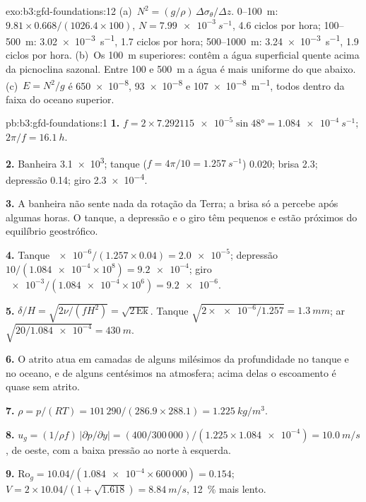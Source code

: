 \begin{solution}{exo:b3:gfd-foundations:12}
(a)~$N^2 = (g/\rho)\,\Delta\sigma_\theta/\Delta z$. 0--\qty{100}{m}:
$9.81\times0.668/(1026.4\times100)$, $N = \qty{7.99e-3}{s^{-1}}$, 4.6
ciclos por hora; 100--\qty{500}{m}: \qty{3.02e-3}{s^{-1}}, 1.7 ciclos por
hora; 500--\qty{1000}{m}: \qty{3.24e-3}{s^{-1}}, 1.9 ciclos por hora.
(b)~Os \qty{100}{m} superiores: contêm a água superficial quente acima da
picnoclina sazonal. Entre 100 e \qty{500}{m} a água é mais
uniforme do que abaixo. (c)~$E = N^2/g$ é \num{650e-8}, \num{93e-8} e
\qty{107e-8}{m^{-1}}, todos dentro da faixa do oceano superior.
\end{solution}

\begin{solution}{pb:b3:gfd-foundations:1}
\textbf{1.} $f = 2\times\num{7.292115e-5}\sin\ang{48} =
\qty{1.084e-4}{s^{-1}}$; $2\pi/f = \qty{16.1}{h}$.

\textbf{2.} Banheira \num{3.1e3}; tanque ($f = 4\pi/10 = \qty{1.257}{s^{-1}}$)
0.020; brisa 2.3; depressão 0.14; giro \num{2.3e-4}.

\textbf{3.} A banheira não sente nada da rotação da Terra; a brisa
só a percebe após algumas horas. O tanque, a depressão e o giro têm
 pequenos e estão próximos do equilíbrio geostrófico.

\textbf{4.} Tanque $\num{e-6}/(1.257\times0.04) = \num{2.0e-5}$; depressão
$10/(\num{1.084e-4}\times10^8) = \num{9.2e-4}$; giro
$\num{e-3}/(\num{1.084e-4}\times10^6) = \num{9.2e-6}$.

\textbf{5.} $\delta/H = \sqrt{2\nu/(fH^2)} = \sqrt{2\,\mathrm{Ek}}$. Tanque
$\sqrt{2\times\num{e-6}/1.257} = \qty{1.3}{mm}$; ar $\sqrt{20/\num{1.084e-4}}
= \qty{430}{m}$.

\textbf{6.} O atrito atua em camadas de alguns milésimos da profundidade no
tanque e no oceano, e de alguns centésimos na atmosfera; acima delas o
escoamento é quase sem atrito.

\textbf{7.} $\rho = p/(RT) = 101\,290/(286.9\times288.1) =
\qty{1.225}{kg/m^3}$.

\textbf{8.} $u_g = (1/\rho f)\,|\partial p/\partial y| = (400/300\,000)/(1.225
\times\num{1.084e-4}) = \qty{10.0}{m/s}$, de oeste, com a baixa
pressão ao norte à esquerda.

\textbf{9.} $\mathrm{Ro}_g = 10.04/(\num{1.084e-4}\times600\,000) = 0.154$;
$V = 2\times10.04/(1 + \sqrt{1.618}) = \qty{8.84}{m/s}$, \qty{12}{\percent}
mais lento.


\end{solution}
